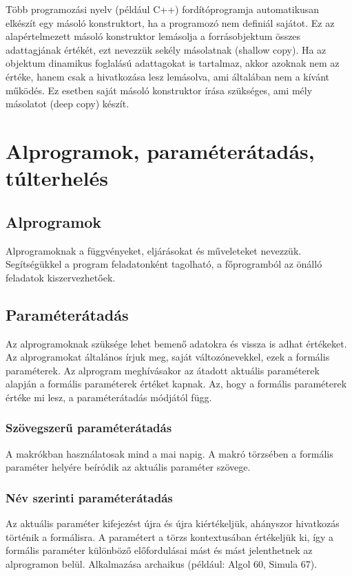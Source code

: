 \documentclass[margin=0px]{article}
\begin{document}
	Több programozási nyelv (például C++) fordítóprogramja automatikusan elkészít egy másoló konstruktort, ha a programozó nem definiál sajátot. Ez az alapértelmezett másoló konstruktor lemásolja a forrásobjektum összes adattagjának értékét, ezt nevezzük sekély másolatnak (shallow copy). Ha az objektum dinamikus foglalású adattagokat is tartalmaz, akkor azoknak nem az értéke, hanem csak a hivatkozása lesz lemásolva, ami általában nem a kívánt működés. Ez esetben saját másoló konstruktor írása szükséges, ami mély másolatot (deep copy) készít.
	
	\section{Alprogramok, paraméterátadás, túlterhelés}
	
	\subsection{Alprogramok}
	
	Alprogramoknak a függvényeket, eljárásokat és műveleteket nevezzük. Segítségükkel a program feladatonként tagolható, a főprogramból az önálló feladatok kiszervezhetőek.
	
	\subsection{Paraméterátadás}
	
	Az alprogramoknak szüksége lehet bemenő adatokra és vissza is adhat értékeket. Az alprogramokat általános írjuk meg, saját változónevekkel, ezek a formális paraméterek. Az alprogram meghívásakor az átadott aktuális paraméterek alapján a formális paraméterek értéket kapnak. Az, hogy a formális paraméterek értéke mi lesz, a paraméterátadás módjától függ.
	
	\subsubsection{Szövegszerű paraméterátadás}
	
	A makrókban használatosak mind a mai napig. A makró törzsében a formális paraméter helyére beíródik az aktuális paraméter szövege.
	
	\subsubsection{Név szerinti paraméterátadás}
	
	Az aktuális paraméter kifejezést újra és újra kiértékeljük, ahányszor hivatkozás történik a formálisra. A paramétert a törzs kontextusában értékeljük ki, így a formális paraméter különböző előfordulásai mást és mást jelenthetnek az alprogramon belül.
	Alkalmazása archaikus (például: Algol 60, Simula 67).
	
\end{document}
